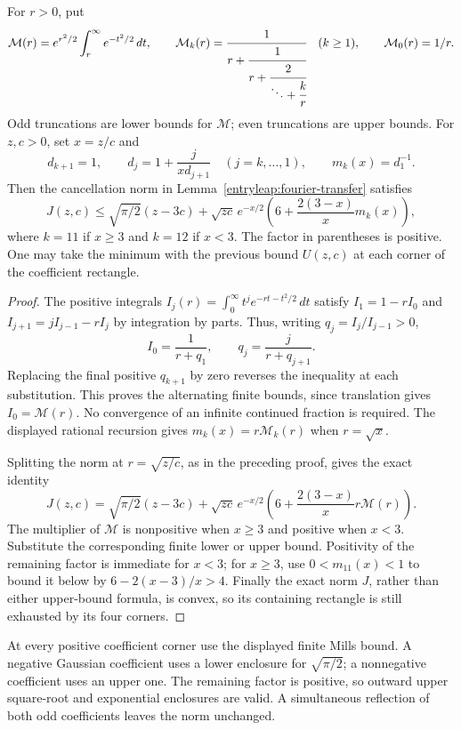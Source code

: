\begin{lemma}\label{entry189:mills}
For $r>0$, put
\[
 \mathcal M(r)=e^{r^2/2}\int_r^\infty e^{-t^2/2}\,dt,
 \qquad
 \mathcal M_k(r)=\cfrac1{r+\cfrac1{r+\cfrac2{\ddots+\cfrac{k}{r}}}}
 \quad(k\ge1),\qquad \mathcal M_0(r)=1/r.
\]
Odd truncations are lower bounds for $\mathcal M$; even truncations
are upper bounds. For $z,c>0$, set $x=z/c$ and
\[
 d_{k+1}=1,\qquad d_j=1+\frac j{xd_{j+1}}\quad(j=k,\ldots,1),
 \qquad m_k(x)=d_1^{-1}.
\]
Then the cancellation norm in Lemma~\ref{entryleap:fourier-transfer}
satisfies
\begin{equation}\label{entry189:mills-bound}
 J(z,c)\le \sqrt{\pi/2}(z-3c)+\sqrt{zc}\,e^{-x/2}
 \left(6+\frac{2(3-x)}x m_k(x)\right),
\end{equation}
where $k=11$ if $x\ge3$ and $k=12$ if $x<3$.
The factor in parentheses is positive. One may take the minimum with
the previous bound $U(z,c)$ at each corner of the coefficient rectangle.
\end{lemma}
\begin{proof}
The positive integrals
$I_j(r)=\int_0^\infty t^j e^{-rt-t^2/2}\,dt$ satisfy
$I_1=1-rI_0$ and $I_{j+1}=jI_{j-1}-rI_j$ by integration by parts.
Thus, writing $q_j=I_j/I_{j-1}>0$,
\[
 I_0=\frac1{r+q_1},\qquad q_j=\frac j{r+q_{j+1}}.
\]
Replacing the final positive $q_{k+1}$ by zero reverses the inequality
at each substitution. This proves the alternating finite bounds, since
translation gives $I_0=\mathcal M(r)$. No convergence of an infinite
continued fraction is required. The displayed rational recursion gives
$m_k(x)=r\mathcal M_k(r)$ when $r=\sqrt x$.

Splitting the norm at $r=\sqrt{z/c}$, as in the preceding proof, gives
the exact identity
\[
 J(z,c)=\sqrt{\pi/2}(z-3c)+\sqrt{zc}\,e^{-x/2}
 \left(6+\frac{2(3-x)}x r\mathcal M(r)\right).
\]
The multiplier of $\mathcal M$ is nonpositive when $x\ge3$ and
positive when $x<3$. Substitute the corresponding finite lower or
upper bound. Positivity of the remaining factor is immediate for
$x<3$; for $x\ge3$, use $0<m_{11}(x)<1$ to bound it below by
$6-2(x-3)/x>4$. Finally the exact norm $J$, rather than either
upper-bound formula, is convex, so its containing rectangle is still
exhausted by its four corners.
\end{proof}

At every positive coefficient corner use the displayed finite Mills bound.
A negative Gaussian coefficient uses a lower enclosure for
$\sqrt{\pi/2}$; a nonnegative coefficient uses an upper one. The remaining
factor is positive, so outward upper square-root and exponential enclosures
are valid. A simultaneous reflection of both odd coefficients leaves the
norm unchanged.


